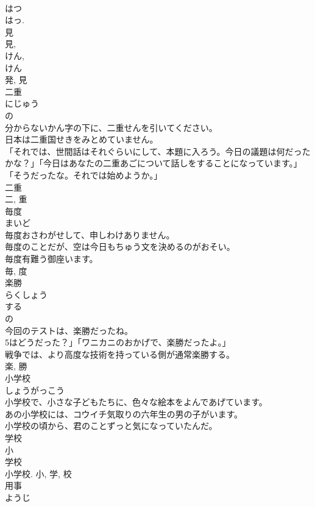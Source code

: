 \documentclass[8pt]{extreport}
\begin{document}
\begin{CJK}{UTF8}{min}
\\	はつ 
\\	はっ. 
\\	見 
\\	見, 
\\	けん, 
\\	けん 
\\	発, 見	
\\	二重	
\\	にじゅう	
\\	の 
\\	分からないかん字の下に、二重せんを引いてください。	
\\	日本は二重国せきをみとめていません。	
\\	「それでは、世間話はそれぐらいにして、本題に入ろう。今日の議題は何だったかな？」「今日はあなたの二重あごについて話しをすることになっています。」「そうだったな。それでは始めようか。」	
\\	二重 
\\	二, 重	
\\	毎度	
\\	まいど	
\\	毎度おさわがせして、申しわけありません。	
\\	毎度のことだが、空は今日もちゅう文を決めるのがおそい。	
\\	毎度有難う御座います。	
\\	毎, 度	
\\	楽勝	
\\	らくしょう	
\\	する 
\\	の 
\\	今回のテストは、楽勝だったね。	
\\	5はどうだった？」「ワニカニのおかげで、楽勝だったよ。」	
\\	戦争では、より高度な技術を持っている側が通常楽勝する。	
\\	楽, 勝	
\\	小学校	
\\	しょうがっこう	
\\	小学校で、小さな子どもたちに、色々な絵本をよんであげています。	
\\	あの小学校には、コウイチ気取りの六年生の男の子がいます。	
\\	小学校の頃から、君のことずっと気になっていたんだ。	
\\	学校 
\\	小 
\\	学校 
\\	小学校.	小, 学, 校	
\\	用事	
\\	ようじ	

\end{CJK}
\end{document}
